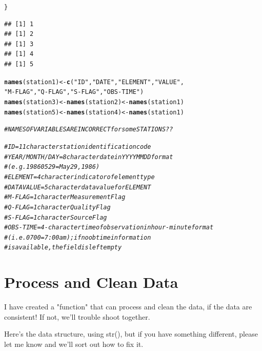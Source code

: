 \documentclass{article}\usepackage[]{graphicx}\usepackage[]{xcolor}
\makeatletter
\newcommand{\hlstr}[1]{\textcolor[rgb]{0.192,0.494,0.8}{#1}}%
\newcommand{\hlcom}[1]{\textcolor[rgb]{0.678,0.584,0.686}{\textit{#1}}}%
\newcommand{\hlstd}[1]{\textcolor[rgb]{0.345,0.345,0.345}{#1}}%
\newcommand{\hlkwb}[1]{\textcolor[rgb]{0.69,0.353,0.396}{#1}}%
\newcommand{\hlkwd}[1]{\textcolor[rgb]{0.737,0.353,0.396}{\textbf{#1}}}%
\newenvironment{kframe}{%
 \def\at@end@of@kframe{}%
 \ifinner\ifhmode%
  \def\at@end@of@kframe{\end{minipage}}%
  \begin{minipage}{\columnwidth}%
 \fi\fi%
 \def\FrameCommand##1{\hskip\@totalleftmargin \hskip-\fboxsep
 \colorbox{shadecolor}{##1}\hskip-\fboxsep
     \hskip-\linewidth \hskip-\@totalleftmargin \hskip\columnwidth}%
 \MakeFramed {\advance\hsize-\width
   \@totalleftmargin\z@ \linewidth\hsize
   \@setminipage}}%
 {\par\unskip\endMakeFramed%
 \at@end@of@kframe}
\newenvironment{knitrout}{}{} %
\makeatother
\begin{document}
\begin{knitrout}
\begin{kframe}
\begin{alltt}
\hlstd{\}}
\end{alltt}
\begin{verbatim}
## [1] 1
## [1] 2
## [1] 3
## [1] 4
## [1] 5
\end{verbatim}
\begin{alltt}
\hlkwd{names}\hlstd{(station1)} \hlkwb{<-} \hlkwd{c}\hlstd{(}\hlstr{"ID"}\hlstd{,} \hlstr{"DATE"}\hlstd{,} \hlstr{"ELEMENT"}\hlstd{,} \hlstr{"VALUE"}\hlstd{,}
                     \hlstr{"M-FLAG"}\hlstd{,} \hlstr{"Q-FLAG"}\hlstd{,} \hlstr{"S-FLAG"}\hlstd{,} \hlstr{"OBS-TIME"}\hlstd{)}
\hlkwd{names}\hlstd{(station3)} \hlkwb{<-} \hlkwd{names}\hlstd{(station2)} \hlkwb{<-} \hlkwd{names}\hlstd{(station1)}
\hlkwd{names}\hlstd{(station5)} \hlkwb{<-} \hlkwd{names}\hlstd{(station4)} \hlkwb{<-} \hlkwd{names}\hlstd{(station1)}

\hlcom{# NAMES OF VARIABLES ARE INCORRECT for some STATIONS??}

  \hlcom{#ID = 11 character station identification code}
  \hlcom{#YEAR/MONTH/DAY = 8 character date in YYYYMMDD format }
  \hlcom{#                     (e.g. 19860529 = May 29, 1986)}
  \hlcom{#ELEMENT = 4 character indicator of element type }
  \hlcom{#DATA VALUE = 5 character data value for ELEMENT }
  \hlcom{#M-FLAG = 1 character Measurement Flag }
  \hlcom{#Q-FLAG = 1 character Quality Flag }
  \hlcom{#S-FLAG = 1 character Source Flag }
  \hlcom{#OBS-TIME = 4-character time of observation in hour-minute format}
  \hlcom{#                     (i.e. 0700 =7:00 am); if no ob time information }
 \hlcom{#is available, the field is left empty}
\end{alltt}
\end{kframe}
\end{knitrout}

\section{Process and Clean Data}


I have created a "function" that can process and clean the data, if the data are consistent!  If not, we'll trouble shoot together. 

Here's the data structure, using str(), but if you have something different, please let me know and we'll sort out how to fix it. 
\end{document}
